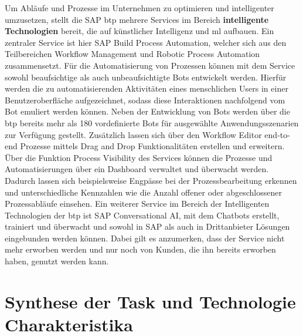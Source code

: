 Um Abläufe und Prozesse im Unternehmen zu optimieren und intelligenter umzusetzen, stellt die SAP \ac{btp} mehrere Services im Bereich \textbf{intelligente Technologien} bereit, die auf künstlicher Intelligenz und \ac{ml} aufbauen.  Ein zentraler Service ist hier SAP Build Process Automation, welcher sich aus den Teilbereichen Workflow Management und Robotic Process Automation zusammensetzt. Für die Automatisierung von Prozessen können mit dem Service sowohl beaufsichtige als auch unbeaufsichtigte Bots entwickelt werden. Hierfür werden die zu automatisierenden Aktivitäten eines menschlichen Users in einer Benutzeroberfläche aufgezeichnet, sodass diese Interaktionen nachfolgend vom Bot emuliert werden können. Neben der Entwicklung von Bots werden über die \ac{btp} bereits mehr als 180 vordefinierte Bots für ausgewählte Anwendungsszenarien zur Verfügung gestellt. \autocite[Vgl.][S. 74-76]{SEUBERT} Zusätzlich lassen sich über den Workflow Editor end-to-end Prozesse mittels Drag and Drop Funktionalitäten erstellen und erweitern. Über die Funktion Process Visibility des Services können die Prozesse und Automatisierungen über ein Dashboard verwaltet und überwacht werden. Dadurch lassen sich beispielsweise Engpässe bei der Prozessbearbeitung erkennen und unterschiedliche Kennzahlen wie die Anzahl offener oder abgeschlossener Prozessabläufe einsehen. \autocite[Vgl.][S. 5]{FSDBPA}
Ein weiterer Service im Bereich der Intelligenten Technologien der \ac{btp} ist SAP Conversational AI, mit dem Chatbots erstellt, trainiert und überwacht und sowohl in SAP als auch in Drittanbieter Lösungen eingebunden werden können. Dabei gilt es anzumerken, dass der Service nicht mehr erworben werden und nur noch von Kunden, die ihn bereits erworben haben, genutzt werden kann. \autocite[Vgl.][]{CONVERSATIONALFSD2021}




\section{Synthese der Task und Technologie Charakteristika}


